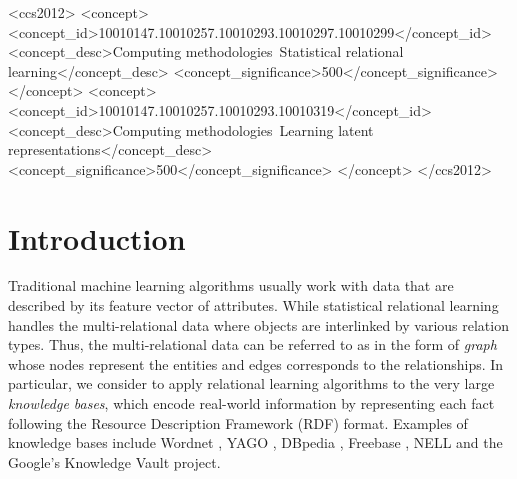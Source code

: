 \documentclass[9pt]{sig-alternate-05-2015}
\begin{document}
%
%

\begin{CCSXML}
<ccs2012>
<concept>
<concept_id>10010147.10010257.10010293.10010297.10010299</concept_id>
<concept_desc>Computing methodologies~Statistical relational learning</concept_desc>
<concept_significance>500</concept_significance>
</concept>
<concept>
<concept_id>10010147.10010257.10010293.10010319</concept_id>
<concept_desc>Computing methodologies~Learning latent representations</concept_desc>
<concept_significance>500</concept_significance>
</concept>
</ccs2012>
\end{CCSXML}



%
%

%
%
\printccsdesc



\section{Introduction}
Traditional machine learning algorithms usually work with data that are described by its feature vector of attributes. While statistical relational learning handles the multi-relational data where objects are interlinked by various relation types. Thus, the multi-relational data can be referred to as in the form of \emph{graph} whose nodes represent the entities and edges corresponds to the relationships. In particular, we consider to apply relational learning algorithms to the very large \emph{knowledge bases}, which encode real-world information by representing each fact following the Resource Description Framework (RDF) format.  Examples of knowledge bases include Wordnet \cite{miller_wordnet:_1995}, YAGO \cite{suchanek_yago:_2007}, DBpedia \cite{lehmann_dbpedialarge-scale_2015}, Freebase \cite{bollacker_freebase:_2008}, NELL \cite{betteridge_toward_2009} and the Google's Knowledge Vault project\cite{dong_knowledge_2014}.  

\end{document}
